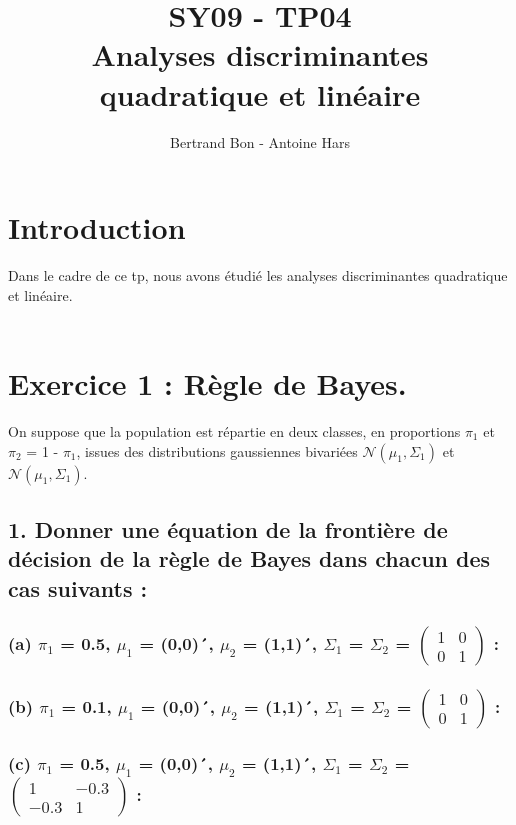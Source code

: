 \documentclass[a4paper, 10pt]{article}
\title{SY09 - TP04\\Analyses discriminantes quadratique et linéaire}
\author{Bertrand Bon - Antoine Hars}
\begin{document}
\maketitle

\section*{Introduction}
Dans le cadre de ce tp, nous avons étudié les analyses discriminantes quadratique et linéaire.\\ \\

\section*{Exercice 1 : Règle de Bayes.}
On suppose que la population est répartie en deux classes, en proportions $\pi_{1}$ et $\pi_{2}$ = 1 - $\pi_{1}$,
issues des distributions gaussiennes bivariées $\mathcal{N}(\mu_{1}, \Sigma_{1})$ et $\mathcal{N}(\mu_{1}, \Sigma_{1})$.\\

\subsection*{1. Donner une équation de la frontière de décision de la règle de Bayes dans chacun des cas suivants :}

\subsubsection*{(a) $\pi_{1}$ = 0.5, $\mu_{1}$ = (0,0)´, $\mu_{2}$ = (1,1)´, $\Sigma_{1}$ = $\Sigma_{2}$ =
$\begin{pmatrix} 1 & 0 \\ 0 & 1 \end{pmatrix}$ :}

\subsubsection*{(b) $\pi_{1}$ = 0.1, $\mu_{1}$ = (0,0)´, $\mu_{2}$ = (1,1)´, $\Sigma_{1}$ = $\Sigma_{2}$ =
$\begin{pmatrix} 1 & 0 \\ 0 & 1 \end{pmatrix}$ :}

\subsubsection*{(c) $\pi_{1}$ = 0.5, $\mu_{1}$ = (0,0)´, $\mu_{2}$ = (1,1)´, $\Sigma_{1}$ = $\Sigma_{2}$ =
$\begin{pmatrix} 1 & -0.3 \\ -0.3 & 1 \end{pmatrix}$ :}
\end{document}
